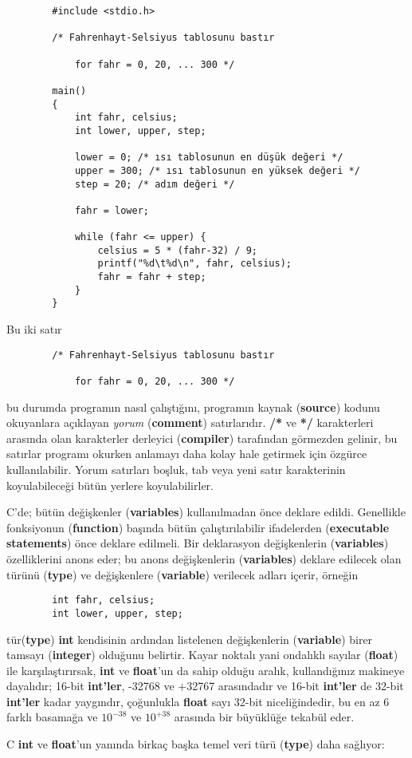 \documentclass[a4paper,12pt,oneside]{book}
\begin{document}
\begin{lstlisting}
		#include <stdio.h>

		/* Fahrenhayt-Selsiyus tablosunu bastır

			for fahr = 0, 20, ... 300 */

		main()
		{
			int fahr, celsius;
			int lower, upper, step;

			lower = 0; /* ısı tablosunun en düşük değeri */
			upper = 300; /* ısı tablosunun en yüksek değeri */
			step = 20; /* adım değeri */

			fahr = lower;

			while (fahr <= upper) {
				celsius = 5 * (fahr-32) / 9;
				printf("%d\t%d\n", fahr, celsius);
				fahr = fahr + step;
			}
		}
\end{lstlisting}
Bu iki satır \begin{lstlisting}
		/* Fahrenhayt-Selsiyus tablosunu bastır

			for fahr = 0, 20, ... 300 */
\end{lstlisting}
bu durumda programın nasıl çalıştığını, programın kaynak (\textbf{source}) kodunu okuyanlara açıklayan \textit{yorum} (\textbf{comment}) satırlarıdır. \textbf{/*} ve \textbf{*/} karakterleri arasında olan karakterler derleyici (\textbf{compiler}) tarafından görmezden gelinir, bu satırlar programı okurken anlamayı daha kolay hale getirmek için özgürce kullanılabilir. Yorum satırları boşluk, tab veya yeni satır karakterinin koyulabileceği bütün yerlere koyulabilirler.
\par C'de; bütün değişkenler (\textbf{variables}) kullanılmadan önce deklare edildi. Genellikle fonksiyonun (\textbf{function}) başında bütün çalıştırılabilir ifadelerden (\textbf{executable statements}) önce deklare edilmeli. Bir deklarasyon değişkenlerin (\textbf{variables}) özelliklerini anons eder; bu anons değişkenlerin (\textbf{variables}) deklare edilecek olan türünü (\textbf{type}) ve değişkenlere (\textbf{variable}) verilecek adları içerir, örneğin
\newline
\begin{lstlisting}
		int fahr, celsius;
		int lower, upper, step;
\end{lstlisting}
tür(\textbf{type}) \textbf{int} kendisinin ardından listelenen değişkenlerin (\textbf{variable}) birer tamsayı (\textbf{integer}) olduğunu belirtir. Kayar noktalı yani ondalıklı sayılar (\textbf{float}) ile karşılaştırırsak, \textbf{int} ve \textbf{float}'un da sahip olduğu aralık, kullandığınız makineye dayalıdır; 16-bit \textbf{int'ler}, -32768 ve +32767 arasındadır ve 16-bit \textbf{int'ler} de 32-bit \textbf{int'ler} kadar yaygındır, çoğunlukla \textbf{float} sayı 32-bit niceliğindedir, bu en az 6 farklı basamağa ve $10^{-38}$ ve $10^{+38}$ arasında bir büyüklüğe tekabül eder.
\par C \textbf{int} ve \textbf{float}'un yanında birkaç başka temel veri türü (\textbf{type}) daha sağlıyor:
\end{document}
